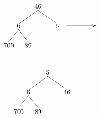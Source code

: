 \begin{minipage}{0.3\textwidth}
\[\begin{xy}
,(0,0)*+=<10mm>[]\txt<2cm>{46}
,(-10,-10)*+=<10mm>[]\txt<2cm>{6}
,(10,-10)*+=<10mm>[]\txt<2cm>{5}
,(-15,-20)*+=<10mm>[]\txt<2cm>{700}
,(-5,-20)*+=<10mm>[]\txt<2cm>{89}

\ar@{->} (15,-10);(30,-10)
\ar@{-} (0,-2);(-10,-9) %
\ar@{-} (0,-2);(9,-8) %
\ar@{-} (-10,-12);(-15,-18) %
\ar@{-} (-10,-12);(-5,-18) %
\end{xy}\]
\end{minipage}
\begin{minipage}{0.5\textwidth}
\[\begin{xy}
,(0,0)*+=<10mm>[]\txt<2cm>{5}
,(-10,-10)*+=<10mm>[]\txt<2cm>{6}
,(10,-10)*+=<10mm>[]\txt<2cm>{46}
,(-15,-20)*+=<10mm>[]\txt<2cm>{700}
,(-5,-20)*+=<10mm>[]\txt<2cm>{89}

\ar@{-} (0,-2);(-10,-9) %
\ar@{-} (0,-2);(9,-8) %
\ar@{-} (-10,-12);(-15,-18) %
\ar@{-} (-10,-12);(-5,-18) %
\end{xy}\]
\end{minipage}
